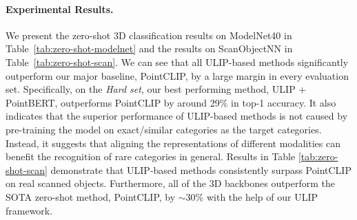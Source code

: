 \documentclass[10pt,twocolumn,letterpaper]{article}
\begin{document}
\paragraph{Experimental Results.}
We present the zero-shot 3D classification results on ModelNet40 in Table~\ref{tab:zero-shot-modelnet} and the results on ScanObjectNN in Table~\ref{tab:zero-shot-scan}. We can see that all ULIP-based methods significantly outperform our major baseline, PointCLIP, by a large margin in every evaluation set.
Specifically, on the \emph{Hard set}, our best performing method, ULIP + PointBERT, outperforms PointCLIP by around 29\% in top-1 accuracy. It also indicates that the superior performance of ULIP-based methods is not caused by pre-training the model on exact/similar categories as the target categories.
Instead, it suggests that aligning the representations of different modalities can benefit the recognition of rare categories in general. Results in Table \ref{tab:zero-shot-scan} demonstrate that ULIP-based methods consistently surpass PointCLIP on real scanned objects. Furthermore, all of the 3D backbones outperform the SOTA zero-shot method, PointCLIP, by $\sim$30\% with the help of our ULIP framework.



\end{document}
